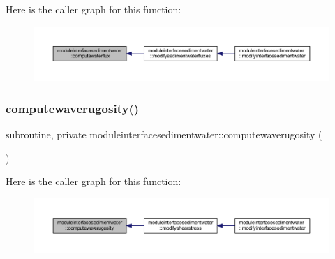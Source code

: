 Here is the caller graph for this function\+:\nopagebreak
\begin{figure}[H]
\begin{center}
\leavevmode
\includegraphics[width=350pt]{namespacemoduleinterfacesedimentwater_a53be621f24e2efe413055d68cd165ba9_icgraph}
\end{center}
\end{figure}
\mbox{\label{namespacemoduleinterfacesedimentwater_a25379264e67d8f64f1b5eb254353c22f}} 
\subsubsection{\texorpdfstring{computewaverugosity()}{computewaverugosity()}}
{\footnotesize\ttfamily subroutine, private moduleinterfacesedimentwater\+::computewaverugosity (\begin{DoxyParamCaption}{ }\end{DoxyParamCaption})\hspace{0.3cm}{\ttfamily [private]}}

Here is the caller graph for this function\+:\nopagebreak
\begin{figure}[H]
\begin{center}
\leavevmode
\includegraphics[width=350pt]{namespacemoduleinterfacesedimentwater_a25379264e67d8f64f1b5eb254353c22f_icgraph}
\end{center}
\end{figure}
\mbox{\label{namespacemoduleinterfacesedimentwater_a8334efc0d8743e6adfd52831e97bb260}} 
